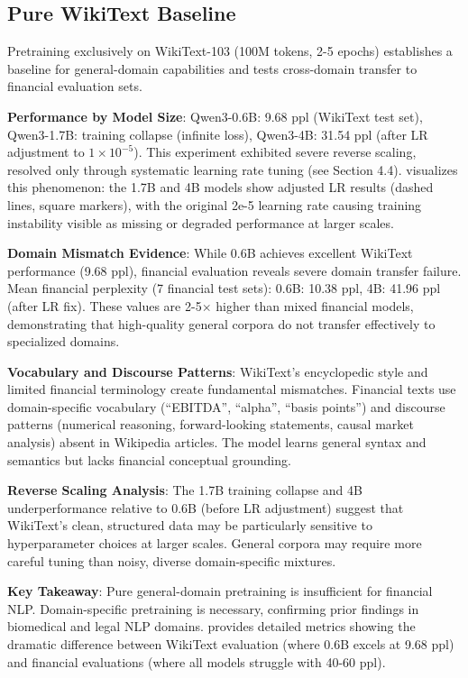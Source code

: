 

\subsection{Pure WikiText Baseline}

Pretraining exclusively on WikiText-103 (100M tokens, 2-5 epochs) establishes a baseline for general-domain capabilities and tests cross-domain transfer to financial evaluation sets.

\textbf{Performance by Model Size}: Qwen3-0.6B: 9.68 ppl (WikiText test set), Qwen3-1.7B: training collapse (infinite loss), Qwen3-4B: 31.54 ppl (after LR adjustment to $1 \times 10^{-5}$). This experiment exhibited severe reverse scaling, resolved only through systematic learning rate tuning (see Section 4.4).  visualizes this phenomenon: the 1.7B and 4B models show adjusted LR results (dashed lines, square markers), with the original 2e-5 learning rate causing training instability visible as missing or degraded performance at larger scales.

\textbf{Domain Mismatch Evidence}: While 0.6B achieves excellent WikiText performance (9.68 ppl), financial evaluation reveals severe domain transfer failure. Mean financial perplexity (7 financial test sets): 0.6B: 10.38 ppl, 4B: 41.96 ppl (after LR fix). These values are 2-5$\times$ higher than mixed financial models, demonstrating that high-quality general corpora do not transfer effectively to specialized domains.

\textbf{Vocabulary and Discourse Patterns}: WikiText's encyclopedic style and limited financial terminology create fundamental mismatches. Financial texts use domain-specific vocabulary (``EBITDA'', ``alpha'', ``basis points'') and discourse patterns (numerical reasoning, forward-looking statements, causal market analysis) absent in Wikipedia articles. The model learns general syntax and semantics but lacks financial conceptual grounding.

\textbf{Reverse Scaling Analysis}: The 1.7B training collapse and 4B underperformance relative to 0.6B (before LR adjustment) suggest that WikiText's clean, structured data may be particularly sensitive to hyperparameter choices at larger scales. General corpora may require more careful tuning than noisy, diverse domain-specific mixtures.

\textbf{Key Takeaway}: Pure general-domain pretraining is insufficient for financial NLP. Domain-specific pretraining is necessary, confirming prior findings in biomedical and legal NLP domains.  provides detailed metrics showing the dramatic difference between WikiText evaluation (where 0.6B excels at 9.68 ppl) and financial evaluations (where all models struggle with 40-60 ppl).

